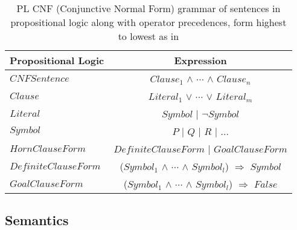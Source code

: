 \begin{table}[H]
  \centering
  \begin{tabular}{lc}
    \toprule

    \textbf{Propositional Logic}  \hspace{1cm}   & \textbf{Expression}  \\
    \toprule
    
    $CNFSentence$ & $Clause_1$ $\wedge$ $\cdots$  $\wedge$ $Clause_n$ \\ \midrule
    $Clause$ & $Literal_1$  $\vee$ $\cdots$  $\vee$  $Literal_m$   \\ \midrule  
    $Literal$ & $Symbol$ | $\neg Symbol$    \\ \midrule
    $Symbol$ & \textit{$P$} | \textit{$Q$} | \textit{$R$} | ...  \\  \midrule

   
	 $HornClauseForm$ & $DefiniteClauseForm$ | $GoalClauseForm$    \\ 
	 $DefiniteClauseForm$ & ($Symbol_1$ $\wedge$ $\cdots$  $\wedge$ $Symbol_l$) $\Rightarrow$ $Symbol$   \\ 
	 $GoalClauseForm$ & ($Symbol_1$ $\wedge$ $\cdots$  $\wedge$ $Symbol_l$) $\Rightarrow$ $False$    \\   
   
    \bottomrule
  \end{tabular}
  \caption{PL CNF (Conjunctive Normal Form) grammar of sentences in propositional logic along with operator precedences, form highest to lowest as in \citep{russell2016artificial}}
  \label{table: BNF_Syntax}
\end{table}












\subsection{Semantics}

%










